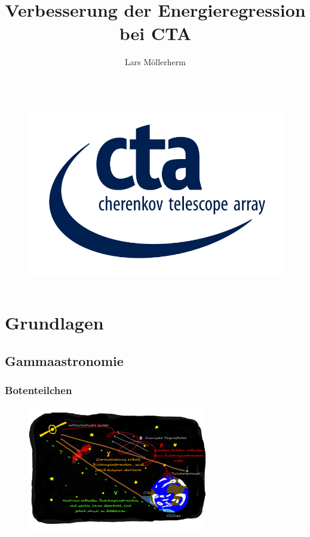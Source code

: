 \documentclass[aspectratio=1610, professionalfonts, 9pt]{beamer}
\title{Verbesserung der Energieregression bei CTA}
\author[L.~Möllerherm]{Lars Möllerherm}
\institute[Experimentelle Physik Vb]{Experimentelle Physik Vb \\  Fakultät Physik}
\begin{document}
  \begin{frame}
    \titlepage
  \end{frame}


  \begin{frame}
    \begin{columns}
      \tableofcontents
      \begin{figure}
        \includegraphics{pictures/CTA_logo.jpg}
        \caption{}
        \label{}
      \end{figure}
    \end{columns}
  \end{frame}

  \section{Grundlagen}
  \subsection{Gammaastronomie}
  \begin{frame}
    \frametitle{Botenteilchen}
      \begin{figure}
        \includegraphics[width=0.7\textwidth]{pictures/Folie5.pdf}
        \caption{}
        \label{abb:folie5}
      \end{figure}
  \end{frame}
\end{document}
